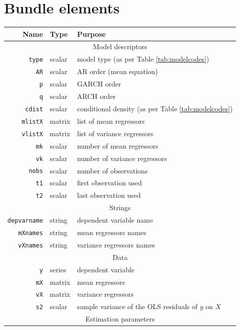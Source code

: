 \documentclass[a4paper,11pt]{article}
\newcounter{script}[section]
\begin{document}
\section{Bundle elements}
\label{sec:bundle_struct}
\begin{footnotesize}
\begin{tabular}{rlp{}}
  \hline
  \textbf{Name} & \textbf{Type} & \textbf{Purpose} \\
  \hline
  \multicolumn{3}{c}{Model descriptors} \\
  \hline
  \texttt{type} & scalar & model type (as per Table \ref{tab:modelcodes})\\
  \texttt{AR} & scalar & AR order (mean equation) \\
  \texttt{p} & scalar & GARCH order\\
  \texttt{q} & scalar & ARCH order\\
  \texttt{cdist} & scalar & conditional density (as per Table \ref{tab:modelcodes})\\
  \texttt{mlistX} & matrix & list of mean regressors \\
  \texttt{vlistX} & matrix & list of variance regressors \\
  \texttt{mk} & scalar & number of mean regressors \\ 
  \texttt{vk} & scalar & number of variance regressors\\
  \texttt{nobs} & scalar & number of observations \\
  \texttt{t1} & scalar & first observation used \\
  \texttt{t2} & scalar & last observation used \\
  \hline
  \multicolumn{3}{c}{Strings} \\
  \hline
  \texttt{depvarname} & string & dependent variable name\\
  \texttt{mXnames} & string    & mean regressors names \\
  \texttt{vXnames} & string    & variance regressors names \\
  \hline
  \multicolumn{3}{c}{Data} \\
  \hline
  \texttt{y} & series  & dependent variable \\
  \texttt{mX} & matrix & mean regressors \\
  \texttt{vX} & matrix & variance regressors\\
  \texttt{s2} & scalar & sample variance of the OLS residuals of $y$ on $X$
  \\
  \hline
  \multicolumn{3}{c}{Estimation parameters} \\

\end{tabular}
\end{footnotesize}
\end{document}
